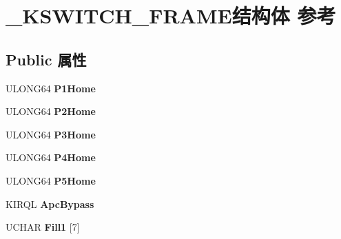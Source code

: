 \hypertarget{struct___k_s_w_i_t_c_h___f_r_a_m_e}{}\section{\+\_\+\+K\+S\+W\+I\+T\+C\+H\+\_\+\+F\+R\+A\+M\+E结构体 参考}
\label{struct___k_s_w_i_t_c_h___f_r_a_m_e}
\subsection*{Public 属性}
\begin{DoxyCompactItemize}
\item 
\mbox{\label{struct___k_s_w_i_t_c_h___f_r_a_m_e_acdee2be3ad19ab6e1137780e033e7e67}} 
U\+L\+O\+N\+G64 {\bfseries P1\+Home}
\item 
\mbox{\label{struct___k_s_w_i_t_c_h___f_r_a_m_e_a1e1f669f252331e41b61883843c8a0aa}} 
U\+L\+O\+N\+G64 {\bfseries P2\+Home}
\item 
\mbox{\label{struct___k_s_w_i_t_c_h___f_r_a_m_e_a4d8f6690b45ca71be5b12c91f645f759}} 
U\+L\+O\+N\+G64 {\bfseries P3\+Home}
\item 
\mbox{\label{struct___k_s_w_i_t_c_h___f_r_a_m_e_ac34d7e511683c2eb7892586b740d44be}} 
U\+L\+O\+N\+G64 {\bfseries P4\+Home}
\item 
\mbox{\label{struct___k_s_w_i_t_c_h___f_r_a_m_e_a9f7151d2b748af39fbf38b1028fcb64e}} 
U\+L\+O\+N\+G64 {\bfseries P5\+Home}
\item 
\mbox{\label{struct___k_s_w_i_t_c_h___f_r_a_m_e_af5f3aecba66ffe80ac3dc1b9112f5cfc}} 
K\+I\+R\+QL {\bfseries Apc\+Bypass}
\item 
\mbox{\label{struct___k_s_w_i_t_c_h___f_r_a_m_e_a34e088ec40bc4a26034992238392b75b}} 
U\+C\+H\+AR {\bfseries Fill1} \mbox{[}7\mbox{]}
\item 
\mbox{\label{struct___k_s_w_i_t_c_h___f_r_a_m_e_a29f8dd62f512b99d99ed0f391336a334}} 

\end{DoxyCompactItemize}
